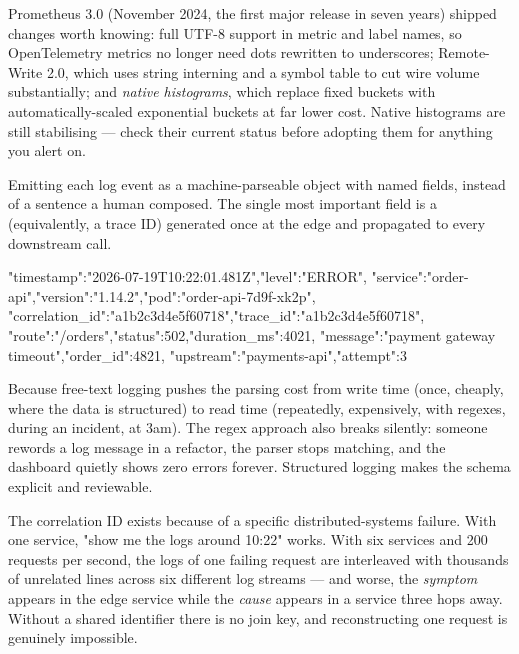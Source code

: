 \begin{perfnote}
Prometheus 3.0 (November 2024, the first major release in seven years) shipped changes worth knowing: full UTF-8 support in metric and label names, so OpenTelemetry metrics no longer need dots rewritten to underscores; Remote-Write 2.0, which uses string interning and a symbol table to cut wire volume substantially; and \emph{native histograms}, which replace fixed buckets with automatically-scaled exponential buckets at far lower cost. Native histograms are still stabilising --- check their current status before adopting them for anything you alert on.
\end{perfnote}


 Emitting each log event as a machine-parseable object with named fields, instead of a sentence a human composed. The single most important field is a  (equivalently, a trace ID) generated once at the edge and propagated to every downstream call.

\begin{outbox}
{"timestamp":"2026-07-19T10:22:01.481Z","level":"ERROR",
 "service":"order-api","version":"1.14.2","pod":"order-api-7d9f-xk2p",
 "correlation_id":"a1b2c3d4e5f60718","trace_id":"a1b2c3d4e5f60718",
 "route":"/orders","status":502,"duration_ms":4021,
 "message":"payment gateway timeout","order_id":4821,
 "upstream":"payments-api","attempt":3}
\end{outbox}

 Because free-text logging pushes the parsing cost from write time (once, cheaply, where the data is structured) to read time (repeatedly, expensively, with regexes, during an incident, at 3am). The regex approach also breaks silently: someone rewords a log message in a refactor, the parser stops matching, and the dashboard quietly shows zero errors forever. Structured logging makes the schema explicit and reviewable.

The correlation ID exists because of a specific distributed-systems failure. With one service, "show me the logs around 10:22" works. With six services and 200 requests per second, the logs of one failing request are interleaved with thousands of unrelated lines across six different log streams --- and worse, the \emph{symptom} appears in the edge service while the \emph{cause} appears in a service three hops away. Without a shared identifier there is no join key, and reconstructing one request is genuinely impossible.

